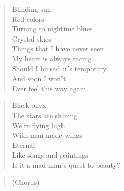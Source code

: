 \begin{minipage}{0.6\textwidth}

    \begin{verse}
    Blinding sun \\
	Red colors \\
	Turning to nightime blues \\
	Crystal skies \\
	Things that I have never seen \\
	My heart is always racing \\
	Should I be sad it's temporary \\
	And soon I won't \\
	Ever feel this way again
    \end{verse}
    
    \begin{verse}
    Black onyx \\
	The stars are shining \\
	We're flying high \\
	With man-made wings \\
	Eternal \\
	Like songs and paintings \\
	Is it a mad-man's quest to beauty?
    \end{verse}

    \begin{verse}
    (Chorus)
    \end{verse}


\end{minipage}
\clearpage
